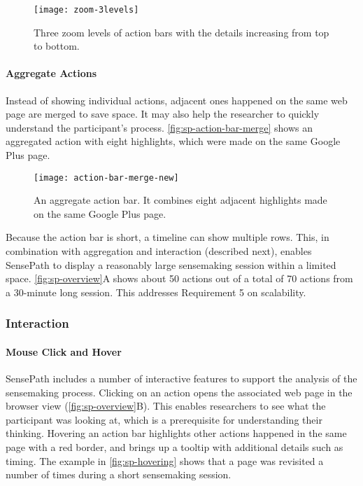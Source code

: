 \begin{figure}[!htb]
\centering
\texttt{[image: zoom-3levels]}
\caption[Three zoom levels of action bars]{Three zoom levels of action bars with the details increasing from top to bottom.}
\label{fig:sp-timeline-zoom}
\end{figure}

\paragraph{Aggregate Actions}
Instead of showing individual actions, adjacent ones happened on the same web page are merged to save space. It may also help the researcher to quickly understand the participant's process. \autoref{fig:sp-action-bar-merge} shows an aggregated action with eight highlights, which were made on the same Google Plus page.

\begin{figure}[!htb]
\centering
\texttt{[image: action-bar-merge-new]}
\caption[An aggregate action bar]{An aggregate action bar. It combines eight adjacent highlights made on the same Google Plus page.}
\label{fig:sp-action-bar-merge}
\end{figure}

Because the action bar is short, a timeline can show multiple rows. This, in combination with aggregation and interaction (described next), enables SensePath to display a reasonably large sensemaking session within a limited space. \autoref{fig:sp-overview}A shows about 50 actions out of a total of 70 actions from a 30-minute long session. This addresses Requirement 5 on scalability.

\subsubsection{Interaction}
\paragraph{Mouse Click and Hover}
SensePath includes a number of interactive features to support the analysis of the sensemaking process. Clicking on an action opens the associated web page in the browser view (\autoref{fig:sp-overview}B). This enables researchers to see what the participant was looking at, which is a prerequisite for understanding their thinking. Hovering an action bar highlights other actions happened in the same page with a red border, and brings up a tooltip with additional details such as timing. The example in \autoref{fig:sp-hovering} shows that a page was revisited a number of times during a short sensemaking session.

